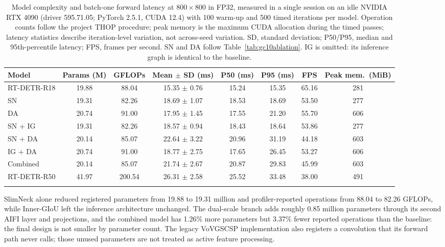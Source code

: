 \documentclass[pdflatex,sn-mathphys-num,iicol]{sn-jnl}
\begin{document}
\begin{table}[t]
\centering
\caption{Model complexity and batch-one forward latency at $800\times800$ in FP32, measured in a single session on an idle NVIDIA RTX 4090 (driver 595.71.05; PyTorch 2.5.1, CUDA 12.4) with 100 warm-up and 500 timed iterations per model. Operation counts follow the project THOP procedure; peak memory is the maximum CUDA allocation during the timed passes; latency statistics describe iteration-level variation, not across-seed variation. SD, standard deviation; P50/P95, median and 95th-percentile latency; FPS, frames per second. SN and DA follow Table~\ref{tab:gc10ablation}. IG is omitted: its inference graph is identical to the baseline.}
\label{tab:complexity}
\scriptsize
\setlength{\tabcolsep}{3.5pt}
\begin{tabular*}{\textwidth}{@{\extracolsep{\fill}}lccccccc@{}}
\toprule
Model & Params (M) & GFLOPs & Mean $\pm$ SD (ms) & P50 (ms) & P95 (ms) & FPS & Peak mem.\ (MiB) \\
\midrule
RT-DETR-R18 & 19.88 & 88.04 & 15.35 $\pm$ 0.76 & 15.24 & 15.35 & 65.16 & 281 \\
SN & 19.31 & 82.26 & 18.69 $\pm$ 1.07 & 18.53 & 18.69 & 53.50 & 277 \\
DA & 20.74 & 91.00 & 17.95 $\pm$ 1.45 & 17.55 & 21.20 & 55.70 & 606 \\
SN + IG & 19.31 & 82.26 & 18.57 $\pm$ 0.94 & 18.43 & 18.64 & 53.86 & 277 \\
SN + DA & 20.14 & 85.07 & 22.64 $\pm$ 3.22 & 20.96 & 31.19 & 44.18 & 603 \\
IG + DA & 20.74 & 91.00 & 18.77 $\pm$ 2.75 & 17.65 & 26.45 & 53.27 & 606 \\
Combined & 20.14 & 85.07 & 21.74 $\pm$ 2.67 & 20.87 & 29.83 & 45.99 & 603 \\
RT-DETR-R50 & 41.97 & 200.54 & 26.31 $\pm$ 2.58 & 25.52 & 33.48 & 38.00 & 491 \\
\botrule
\end{tabular*}
\end{table}

SlimNeck alone reduced registered parameters from 19.88 to 19.31 million and profiler-reported operations from 88.04 to 82.26 GFLOPs, while Inner-GIoU left the inference architecture unchanged. The dual-scale branch adds roughly 0.85 million parameters through its second AIFI layer and projections, and the combined model has 1.26\% more parameters but 3.37\% fewer reported operations than the baseline: the final design is not smaller by parameter count. The legacy VoVGSCSP implementation also registers a convolution that its forward path never calls; those unused parameters are not treated as active feature processing.
\end{document}
